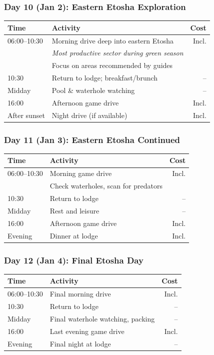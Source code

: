 \documentclass[11pt]{article}
\begin{document}
\subsubsection{Day 10 (Jan 2): Eastern Etosha Exploration}

\begin{tabular}{llr}
\toprule
\textbf{Time} & \textbf{Activity} & \textbf{Cost} \\
\midrule
06:00--10:30 & Morning drive deep into eastern Etosha & Incl. \\
& \textit{Most productive sector during green season} & \\
& Focus on areas recommended by guides & \\
10:30 & Return to lodge; breakfast/brunch & -- \\
Midday & Pool \& waterhole watching & -- \\
16:00 & Afternoon game drive & Incl. \\
After sunset & Night drive (if available) & Incl. \\
\bottomrule
\end{tabular}

\subsubsection{Day 11 (Jan 3): Eastern Etosha Continued}

\begin{tabular}{llr}
\toprule
\textbf{Time} & \textbf{Activity} & \textbf{Cost} \\
\midrule
06:00--10:30 & Morning game drive & Incl. \\
& Check waterholes, scan for predators & \\
10:30 & Return to lodge & -- \\
Midday & Rest and leisure & -- \\
16:00 & Afternoon game drive & Incl. \\
Evening & Dinner at lodge & Incl. \\
\bottomrule
\end{tabular}

\subsubsection{Day 12 (Jan 4): Final Etosha Day}

\begin{tabular}{llr}
\toprule
\textbf{Time} & \textbf{Activity} & \textbf{Cost} \\
\midrule
06:00--10:30 & Final morning drive & Incl. \\
10:30 & Return to lodge & -- \\
Midday & Final waterhole watching, packing & -- \\
16:00 & Last evening game drive & Incl. \\
Evening & Final night at lodge & -- \\
\bottomrule
\end{tabular}
\end{document}
